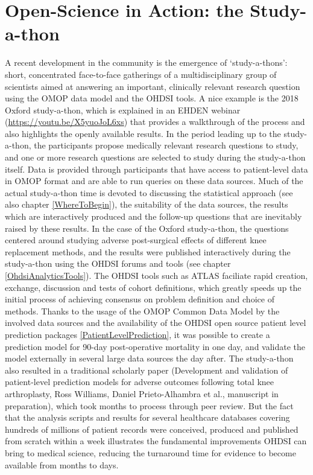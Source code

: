 \documentclass[11pt]{book}
\theoremstyle{definition}
\theoremstyle{definition}
\theoremstyle{definition}
\theoremstyle{remark}
\begin{document}
\hypertarget{open-science-in-action-the-study-a-thon}{%
\section{Open-Science in Action: the Study-a-thon}\label{open-science-in-action-the-study-a-thon}}


A recent development in the community is the emergence of `study-a-thons': short, concentrated face-to-face gatherings of a multidisciplinary group of scientists aimed at answering an important, clinically relevant research question using the OMOP data model and the OHDSI tools. A nice example is the 2018 Oxford study-a-thon, which is explained in an EHDEN webinar (\url{https://youtu.be/X5yuoJoL6xs}) that provides a walkthrough of the process and also highlights the openly available results. In the period leading up to the study-a-thon, the participants propose medically relevant research questions to study, and one or more research questions are selected to study during the study-a-thon itself. Data is provided through participants that have access to patient-level data in OMOP format and are able to run queries on these data sources. Much of the actual study-a-thon time is devoted to discussing the statistical approach (see also chapter \ref{WhereToBegin}), the suitability of the data sources, the results which are interactively produced and the follow-up questions that are inevitably raised by these results. In the case of the Oxford study-a-thon, the questions centered around studying adverse post-surgical effects of different knee replacement methods, and the results were published interactively during the study-a-thon using the OHDSI forums and tools (see chapter \ref{OhdsiAnalyticsTools}). The OHDSI tools such as ATLAS faciliate rapid creation, exchange, discussion and tests of cohort definitions, which greatly speeds up the initial process of achieving consensus on problem definition and choice of methods. Thanks to the usage of the OMOP Common Data Model by the involved data sources and the availability of the OHDSI open source patient level prediction packages \ref{PatientLevelPrediction}, it was possible to create a prediction model for 90-day post-operative mortality in one day, and validate the model externally in several large data sources the day after. The study-a-thon also resulted in a traditional scholarly paper (Development and validation of patient-level prediction models for adverse outcomes following total knee arthroplasty, Ross Williams, Daniel Prieto-Alhambra et al., manuscript in preparation), which took months to process through peer review. But the fact that the analysis scripts and results for several healthcare databases covering hundreds of millions of patient records were conceived, produced and published from scratch within a week illustrates the fundamental improvements OHDSI can bring to medical science, reducing the turnaround time for evidence to become available from months to days.
\end{document}
